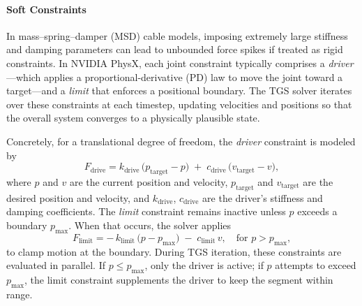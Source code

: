 \documentclass[12pt,twoside,letterpaper]{article}
\begin{document}

\paragraph{Soft Constraints}
In mass--spring--damper (MSD) cable models, imposing extremely large stiffness and damping parameters can lead to unbounded force spikes if treated as rigid constraints. In NVIDIA PhysX, each joint constraint typically comprises a \emph{driver}---which applies a proportional-derivative (PD) law to move the joint toward a target---and a \emph{limit} that enforces a positional boundary. The TGS solver iterates over these constraints at each timestep, updating velocities and positions so that the overall system converges to a physically plausible state.

Concretely, for a translational degree of freedom, the \emph{driver} constraint is modeled by
\begin{equation}
  F_{\text{drive}} 
  = k_{\text{drive}}\, \bigl(p_{\text{target}} - p\bigr)
  \;+\; c_{\text{drive}}\, \bigl(v_{\text{target}} - v\bigr),
  \label{eq:drive_force_TGS}
\end{equation}
where $p$ and $v$ are the current position and velocity, $p_{\text{target}}$ and $v_{\text{target}}$ are the desired position and velocity, and $k_{\text{drive}}$, $c_{\text{drive}}$ are the driver’s stiffness and damping coefficients. The \emph{limit} constraint remains inactive unless $p$ exceeds a boundary $p_{\max}$. When that occurs, the solver applies
\begin{equation}
  F_{\text{limit}}
  = -\,k_{\text{limit}} \, \bigl(p - p_{\max}\bigr) 
    \;-\; c_{\text{limit}}\,v,
  \quad \text{for } p > p_{\max},
  \label{eq:limit_force_TGS}
\end{equation}
to clamp motion at the boundary. During TGS iteration, these constraints are evaluated in parallel. If $p \le p_{\max}$, only the driver is active; if $p$ attempts to exceed $p_{\max}$, the limit constraint supplements the driver to keep the segment within range.
\end{document}
